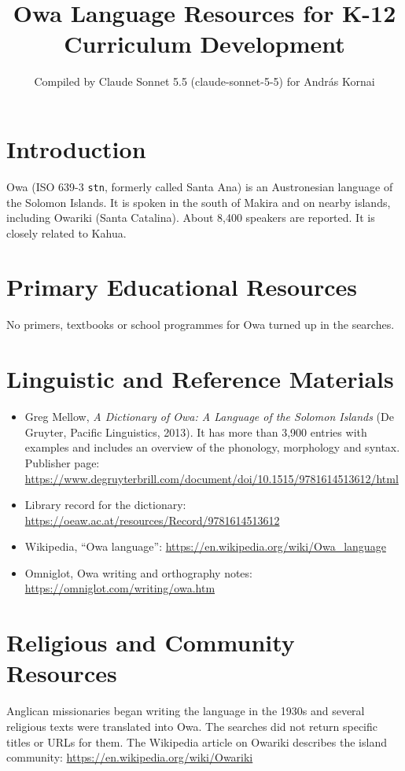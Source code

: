 \documentclass[12pt]{article}
\title{Owa Language Resources for K-12 Curriculum Development}
\author{Compiled by Claude Sonnet 5.5 (claude-sonnet-5-5) for Andr\'as Kornai}
\date{}
\begin{document}
\maketitle

\section{Introduction}
Owa (ISO 639-3 \texttt{stn}, formerly called Santa Ana) is an Austronesian language of the Solomon Islands. It is spoken in the south of Makira and on nearby islands, including Owariki (Santa Catalina). About 8,400 speakers are reported. It is closely related to Kahua.

\section{Primary Educational Resources}
No primers, textbooks or school programmes for Owa turned up in the searches.

\section{Linguistic and Reference Materials}
\begin{itemize}
\item Greg Mellow, \emph{A Dictionary of Owa: A Language of the Solomon Islands} (De Gruyter, Pacific Linguistics, 2013). It has more than 3,900 entries with examples and includes an overview of the phonology, morphology and syntax. Publisher page: \url{https://www.degruyterbrill.com/document/doi/10.1515/9781614513612/html}
\item Library record for the dictionary: \url{https://oeaw.ac.at/resources/Record/9781614513612}
\item Wikipedia, ``Owa language'': \url{https://en.wikipedia.org/wiki/Owa_language}
\item Omniglot, Owa writing and orthography notes: \url{https://omniglot.com/writing/owa.htm}
\end{itemize}

\section{Religious and Community Resources}
Anglican missionaries began writing the language in the 1930s and several religious texts were translated into Owa. The searches did not return specific titles or URLs for them. The Wikipedia article on Owariki describes the island community: \url{https://en.wikipedia.org/wiki/Owariki}
\end{document}
